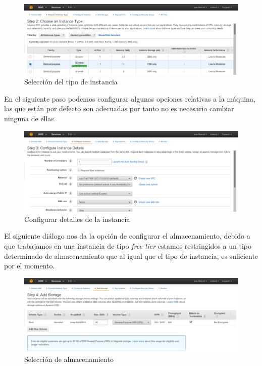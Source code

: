 \begin{figure}[!ht]
  \begin{center}
    \includegraphics[scale=0.30]{../images/kaa/3.png}
		\caption{Selección del tipo de instancia}
    \label{fig:kaa}
	\end{center}
\end{figure}

En el siguiente paso podemos configurar algunas opciones relativas a la máquina, las que están por defecto son adecuadas por tanto no es necesario cambiar ninguna de ellas.

\begin{figure}[!ht]
  \begin{center}
    \includegraphics[scale=0.30]{../images/kaa/4.png}
		\caption{Configurar detalles de la instancia}
    \label{fig:kaa}
	\end{center}
\end{figure}

\newpage

El siguiente diálogo nos da la opción de configurar el almacenamiento, debido a que trabajamos en una instancia de tipo \textit{free tier} estamos restringidos a un tipo determinado de almacenamiento que al igual que el tipo de instancia, es suficiente por el momento.

\begin{figure}[!ht]
  \begin{center}
    \includegraphics[scale=0.30]{../images/kaa/5.png}
		\caption{Selección de almacenamiento}
    \label{fig:kaa}
	\end{center}
\end{figure}

